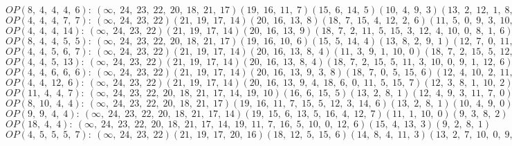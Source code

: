 $OP(8, \;4, \;4, \;4, \;6): \:(\infty, \;24, \;23, \;22, \;20, \;18, \;21, \;17)(19, \;16, \;11, \;7)(15, \;6, \;14, \;5)(10, \;4, \;9, \;3)(13, \;2, \;12, \;1, \;8, \;0)$\\
$OP(4, \;4, \;4, \;7, \;7): \:(\infty, \;24, \;23, \;22)(21, \;19, \;17, \;14)(20, \;16, \;13, \;8)(18, \;7, \;15, \;4, \;12, \;2, \;6)(11, \;5, \;0, \;9, \;3, \;10, \;1)$\\
$OP(4, \;4, \;4, \;14): \:(\infty, \;24, \;23, \;22)(21, \;19, \;17, \;14)(20, \;16, \;13, \;9)(18, \;7, \;2, \;11, \;5, \;15, \;3, \;12, \;4, \;10, \;0, \;8, \;1, \;6)$\\
$OP(8, \;4, \;4, \;5, \;5): \:(\infty, \;24, \;23, \;22, \;20, \;18, \;21, \;17)(19, \;16, \;10, \;6)(15, \;5, \;14, \;4)(13, \;8, \;2, \;9, \;1)(12, \;7, \;0, \;11, \;3)$\\
$OP(4, \;4, \;5, \;6, \;7): \:(\infty, \;24, \;23, \;22)(21, \;19, \;17, \;14)(20, \;16, \;13, \;8, \;4)(11, \;3, \;9, \;1, \;10, \;0)(18, \;7, \;2, \;15, \;5, \;12, \;6)$\\
$OP(4, \;4, \;5, \;13): \:(\infty, \;24, \;23, \;22)(21, \;19, \;17, \;14)(20, \;16, \;13, \;8, \;4)(18, \;7, \;2, \;15, \;5, \;11, \;3, \;10, \;0, \;9, \;1, \;12, \;6)$\\
$OP(4, \;4, \;6, \;6, \;6): \:(\infty, \;24, \;23, \;22)(21, \;19, \;17, \;14)(20, \;16, \;13, \;9, \;3, \;8)(18, \;7, \;0, \;5, \;15, \;6)(12, \;4, \;10, \;2, \;11, \;1)$\\
$OP(4, \;4, \;12, \;6): \:(\infty, \;24, \;23, \;22)(21, \;19, \;17, \;14)(20, \;16, \;13, \;9, \;4, \;18, \;6, \;0, \;11, \;5, \;15, \;7)(12, \;3, \;8, \;1, \;10, \;2)$\\
$OP(11, \;4, \;4, \;7): \:(\infty, \;24, \;23, \;22, \;20, \;18, \;21, \;17, \;14, \;19, \;10)(16, \;6, \;15, \;5)(13, \;2, \;8, \;1)(12, \;4, \;9, \;3, \;11, \;7, \;0)$\\
$OP(8, \;10, \;4, \;4): \:(\infty, \;24, \;23, \;22, \;20, \;18, \;21, \;17)(19, \;16, \;11, \;7, \;15, \;5, \;12, \;3, \;14, \;6)(13, \;2, \;8, \;1)(10, \;4, \;9, \;0)$\\
$OP(9, \;9, \;4, \;4): \:(\infty, \;24, \;23, \;22, \;20, \;18, \;21, \;17, \;14)(19, \;15, \;6, \;13, \;5, \;16, \;4, \;12, \;7)(11, \;1, \;10, \;0)(9, \;3, \;8, \;2)$\\
$OP(18, \;4, \;4): \:(\infty, \;24, \;23, \;22, \;20, \;18, \;21, \;17, \;14, \;19, \;11, \;7, \;16, \;5, \;10, \;0, \;12, \;6)(15, \;4, \;13, \;3)(9, \;2, \;8, \;1)$\\
$OP(4, \;5, \;5, \;5, \;7): \:(\infty, \;24, \;23, \;22)(21, \;19, \;17, \;20, \;16)(18, \;12, \;5, \;15, \;6)(14, \;8, \;4, \;11, \;3)(13, \;2, \;7, \;10, \;0, \;9, \;1)$\\
